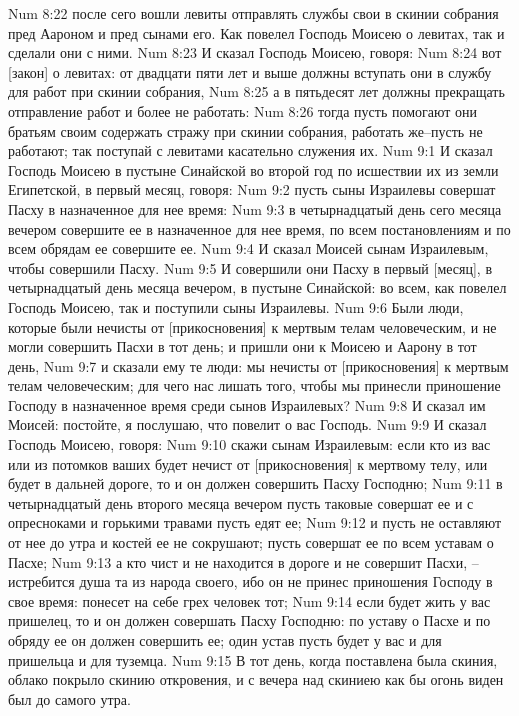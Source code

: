 Num 8:22  после сего вошли левиты отправлять службы свои в скинии собрания пред Аароном и пред сынами его. Как повелел Господь Моисею о левитах, так и сделали они с ними.
Num 8:23  И сказал Господь Моисею, говоря:
Num 8:24  вот [закон] о левитах: от двадцати пяти лет и выше должны вступать они в службу для работ при скинии собрания,
Num 8:25  а в пятьдесят лет должны прекращать отправление работ и более не работать:
Num 8:26  тогда пусть помогают они братьям своим содержать стражу при скинии собрания, работать же--пусть не работают; так поступай с левитами касательно служения их.
Num 9:1  И сказал Господь Моисею в пустыне Синайской во второй год по исшествии их из земли Египетской, в первый месяц, говоря:
Num 9:2  пусть сыны Израилевы совершат Пасху в назначенное для нее время:
Num 9:3  в четырнадцатый день сего месяца вечером совершите ее в назначенное для нее время, по всем постановлениям и по всем обрядам ее совершите ее.
Num 9:4  И сказал Моисей сынам Израилевым, чтобы совершили Пасху.
Num 9:5  И совершили они Пасху в первый [месяц], в четырнадцатый день месяца вечером, в пустыне Синайской: во всем, как повелел Господь Моисею, так и поступили сыны Израилевы.
Num 9:6  Были люди, которые были нечисты от [прикосновения] к мертвым телам человеческим, и не могли совершить Пасхи в тот день; и пришли они к Моисею и Аарону в тот день,
Num 9:7  и сказали ему те люди: мы нечисты от [прикосновения] к мертвым телам человеческим; для чего нас лишать того, чтобы мы принесли приношение Господу в назначенное время среди сынов Израилевых?
Num 9:8  И сказал им Моисей: постойте, я послушаю, что повелит о вас Господь.
Num 9:9  И сказал Господь Моисею, говоря:
Num 9:10  скажи сынам Израилевым: если кто из вас или из потомков ваших будет нечист от [прикосновения] к мертвому телу, или будет в дальней дороге, то и он должен совершить Пасху Господню;
Num 9:11  в четырнадцатый день второго месяца вечером пусть таковые совершат ее и с опресноками и горькими травами пусть едят ее;
Num 9:12  и пусть не оставляют от нее до утра и костей ее не сокрушают; пусть совершат ее по всем уставам о Пасхе;
Num 9:13  а кто чист и не находится в дороге и не совершит Пасхи, --истребится душа та из народа своего, ибо он не принес приношения Господу в свое время: понесет на себе грех человек тот;
Num 9:14  если будет жить у вас пришелец, то и он должен совершать Пасху Господню: по уставу о Пасхе и по обряду ее он должен совершить ее; один устав пусть будет у вас и для пришельца и для туземца.
Num 9:15  В тот день, когда поставлена была скиния, облако покрыло скинию откровения, и с вечера над скиниею как бы огонь виден был до самого утра.
